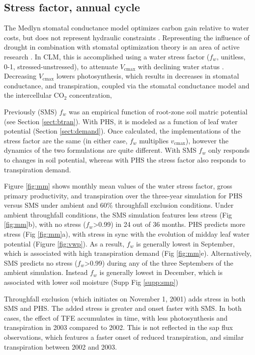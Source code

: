 \documentclass[draft,linenumbers]{agujournal}
\begin{document}
\subsection{Stress factor, annual cycle}

The Medlyn stomatal conductance model optimizes carbon gain relative to water costs, but does not represent hydraulic constraints \citep{medlyn2011}.
Representing the influence of drought in combination with stomatal optimization theory is an area of active research \citep{zhou2013,novick2016a}.
In CLM, this is accomplished using a water stress factor ($f_w$, unitless, 0-1, stressed-unstressed), to attenuate $V_{\text{cmax}}$ with declining water status \citep{oleson2013}. 
Decreasing $V_{\text{cmax}}$ lowers photosynthesis, which results in decreases in stomatal conductance, and transpiration, 
coupled via the stomatal conductance model and the intercellular CO$_2$ concentration, 

Previously (SMS) $f_w$ was an empirical function of root-zone soil matric potential (see Section \ref{sect:btran}).
With PHS, it is modeled as a function of leaf water potential (Section \ref{sect:demand}).
Once calculated, the implementations of the stress factor are the same (in either case, $f_w$ multiplies $v_{\text{cmax}}$),
however the dynamics of the two formulations are quite different.
With SMS $f_w$ only responds to changes in soil potential,
whereas with PHS the stress factor also responds to transpiration demand.

Figure \ref{fig:mm} shows monthly mean values of the water stress factor, gross primary productivity, and transpiration
over the three-year simulation for PHS versus SMS under ambient and 60\% throughfall exclusion conditions.
Under ambient throughfall conditions, the SMS simulation features less stress (Fig \ref{fig:mm}b), with
no stress ($f_w$>0.99) in 24 out of 36 months.
PHS predicts more stress (Fig \ref{fig:mm}a), with stress in sync with the evolution of midday leaf water potential (Figure \ref{fig:vwp}).
As a result, $f_w$ is generally lowest in September, which is associated with high transpiration demand (Fig \ref{fig:mm}e).
Alternatively, SMS predicts no stress ($f_w$>0.99) during any of the three Septembers of the ambient simulation.
Instead $f_w$ is generally lowest in December, which is associated with lower soil moisture (Supp Fig \ref{supp:smp})

Throughfall exclusion (which initiates on November 1, 2001) adds stress in both SMS and PHS.
The added stress is greater and onset faster with SMS.
In both cases, the effect of TFE accumulates in time, with less photosynthesis and transpiration in 2003 compared to 2002.
This is not reflected in the sap flux observations, which features a faster onset of reduced transpiration, and similar transpiration between 2002 and 2003.
\end{document}
